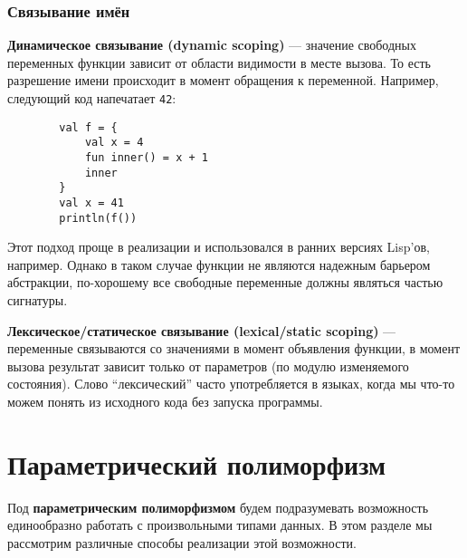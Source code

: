 \documentclass[12pt]{article}
\newcommand{\vocab}[1]{\textbf{#1}} %
\begin{document}
    \subsubsection{Связывание имён}

    \vocab{Динамическое связывание (dynamic scoping)} --- значение свободных переменных функции зависит от области видимости в месте вызова.
    То есть разрешение имени происходит в момент обращения к переменной.
    Например, следующий код напечатает \texttt{42}:
    \begin{verbatim}
        val f = {
            val x = 4
            fun inner() = x + 1
            inner
        }
        val x = 41
        println(f())
    \end{verbatim}

    Этот подход проще в реализации и использовался в ранних версиях Lisp'ов, например.
    Однако в таком случае функции не являются надежным барьером абстракции, по-хорошему все свободные переменные должны являться частью сигнатуры.

    \vocab{Лексическое/статическое связывание (lexical/static scoping)} --- переменные связываются со значениями в момент объявления функции, в момент вызова результат зависит только от параметров (по модулю изменяемого состояния).
    Слово ``лексический'' часто употребляется в языках, когда мы что-то можем понять из исходного кода без запуска программы.







    \cite{reynolds1998definitional}
    \cite{defunctionalization-slides}





    \section{Параметрический полиморфизм}

    Под \vocab{параметрическим полиморфизмом} будем подразумевать возможность единообразно работать с произвольными типами данных.
    В этом разделе мы рассмотрим различные способы реализации этой возможности.
\end{document}
